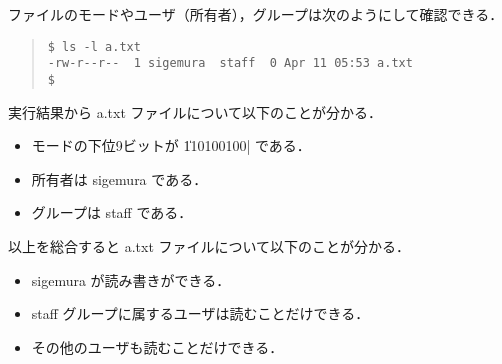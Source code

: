\documentclass{beamer}                 %
\begin{document}
\begin{frame}[fragile]
ファイルのモードやユーザ（所有者），グループは次のようにして確認できる．

\begin{quote}
\begin{lstlisting}[numbers=none]
$ ls -l a.txt
-rw-r--r--  1 sigemura  staff  0 Apr 11 05:53 a.txt
$
\end{lstlisting}
\end{quote}

実行結果から a.txt ファイルについて以下のことが分かる．
\begin{itemize}
\item モードの下位9ビットが \|110100100| である．
\item 所有者は sigemura である．
\item グループは staff である．
\end{itemize}

以上を総合すると a.txt ファイルについて以下のことが分かる．
\begin{itemize}
\item sigemura が読み書きができる．
\item staff グループに属するユーザは読むことだけできる．
\item その他のユーザも読むことだけできる．
\end{itemize}
\end{frame}
\end{document}
